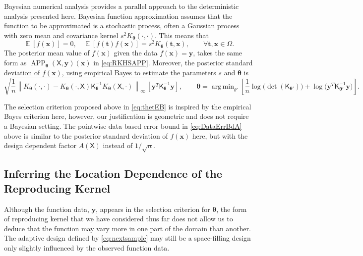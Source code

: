 \documentclass[]{mcom-l}
\theoremstyle{theorem}
\theoremstyle{remark}
\DeclareMathOperator*{\argmin}{arg\,min}
\DeclareMathOperator{\APP}{APP}
\DeclareMathOperator{\Ex}{\mathbb{E}}
\newcommand{\mK}{\mathsf{K}}
\newcommand{\mX}{\mathsf{X}}
\newcommand{\bx}{{\boldsymbol{x}}}
\newcommand{\by}{{\boldsymbol{y}}}
\newcommand{\bt}{{\boldsymbol{t}}}
\newcommand{\btheta}{{\boldsymbol{\theta}}}
\newcommand{\cx}{{\Omega}}
\newcommand{\norm}[2][{}]{\ensuremath{\left \lVert #2 \right \rVert}_{#1}}
\begin{document}
Bayesian numerical analysis \cite{Dia88a,RasWil06a,Ste99} provides a parallel approach to the deterministic analysis presented here.  Bayesian function approximation assumes that the function to be approximated is a stochastic process, often a Gaussian process with zero mean and covariance kernel $s^2 K_\btheta(\cdot, \cdot)$.  This means that 
\begin{equation*}
\Ex[f(\bx)] = 0, \quad \Ex[f(\bt) f(\bx)] = s^2K_\btheta(\bt,\bx), \qquad \forall \bt, \bx \in \cx.
\end{equation*}
The posterior mean value of $f(\bx)$ given the data $f(\bx) = \by$, takes the same form as $\APP_\btheta(\mX,\by)(\bx)$ in \eqref{eq:RKHSAPP}.  Moreover, the posterior standard deviation of $f(\bx)$, using empirical Bayes to estimate the parameters $s$ and $\btheta$ is \cite{Hic17a,??}
\begin{equation*}
\sqrt{\frac 1n \norm[\infty]{K_\btheta(\cdot,\cdot) - K_\btheta(\cdot,\mX) \mK_\btheta^{-1} K_\btheta(\mX,\cdot)} \, [\by^T \mK_\btheta^{-1} \by] }, \qquad \btheta = \argmin_{\theta'}  \left[\frac 1n \log \bigl( \det(\mK_{\btheta'}) \bigr) + \log \bigl ( \by^T \mK_{\btheta'}^{-1} \by \bigr)\right].
\end{equation*}

The selection criterion proposed above in \eqref{eq:thetEB} is inspired by the empirical Bayes criterion here, however, our justification is geometric and does not require a Bayesian setting.  The pointwise data-based error bound in \eqref{eq:DataErrBdA} above is similar to the posterior standard deviation of $f(\bx)$ here, but with the design dependent factor $A(\mX)$ instead of $1/\sqrt{n}$.


\subsection{Inferring the Location Dependence of the Reproducing Kernel} \label{sec:InferSpace}

Although the function data, $\by$, appears in the selection criterion for $\btheta$, the form of reproducing kernel that we have considered thus far does not allow us to deduce that the function may vary more in one part of the domain than another.  The adaptive design defined by \eqref{eq:nextsample} may still be a space-filling design only slightly influenced by the observed function data.
\end{document}
